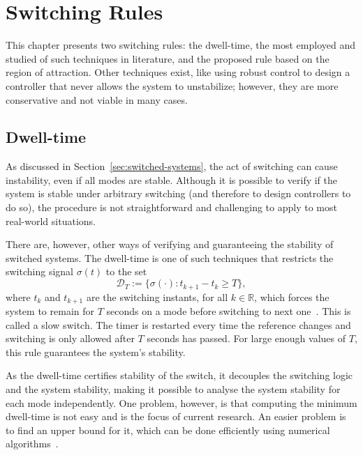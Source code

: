 
\chapter{Switching Rules}%
\label{chp:switching-rules}

This chapter presents two switching rules: the dwell-time, the most employed and
studied of such techniques in literature, and the proposed rule based on the
region of attraction. Other techniques exist, like using robust control to
design a controller that never allows the system to unstabilize; however, they
are more conservative and not viable in many cases.

\section{Dwell-time}%
\label{sec:dwell-time}

As discussed in Section~\ref{sec:switched-systems}, the act of switching can
cause instability, even if all modes are stable. Although it is possible to
verify if the system is stable under arbitrary switching (and therefore to
design controllers to do so), the procedure is not straightforward and
challenging to apply to most real-world situations.

There are, however, other ways of verifying and guaranteeing the stability of
switched systems. The dwell-time is one of such techniques that restricts the
switching signal \(\sigma{}(t)\) to the set
%
\begin{equation}
  \mathcal{D}_{T} := \{\sigma(\cdot):t_{k+1}-t_{k}\ge{}T\},
\end{equation}
%
where \(t_{k}\) and \(t_{k+1}\) are the switching instants, for all
\(k\in{}\mathbb{R}\), which forces the system to remain for \(T\) seconds on a
mode before switching to next one~\parencite{colaneri:dwell}. This is called a
slow switch. The timer is restarted every time the reference changes and
switching is only allowed after \(T\) seconds has passed. For large enough
values of \(T\), this rule guarantees the system's stability.

As the dwell-time certifies stability of the switch, it decouples the switching
logic and the system stability, making it possible to analyse the system
stability for each mode independently. One problem, however, is that computing
the minimum dwell-time is not easy and is the focus of current research. An
easier problem is to find an upper bound for it, which can be done efficiently
using numerical algorithms~\parencite{colaneri:dwell}.

